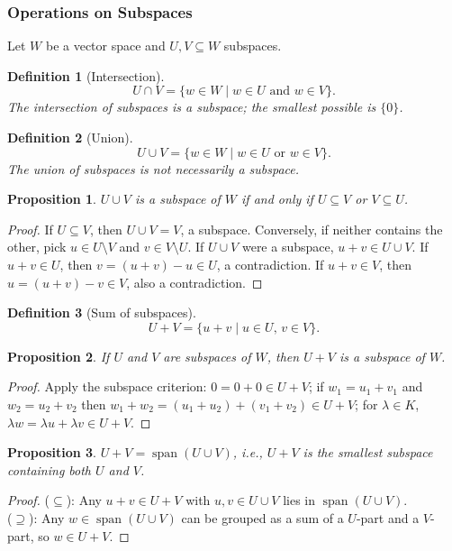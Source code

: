 \documentclass{article}
\newtheorem{definition}{Definition}
\newtheorem{proposition}{Proposition}
\newcommand{\Span}{\operatorname{span}}
\begin{document}
\subsubsection{Operations on Subspaces}
Let $W$ be a vector space and $U,V \subseteq W$ subspaces.
\begin{definition}[Intersection]
    \[U \cap V = \{w \in W \mid w \in U \text{ and } w \in V\}.\]
    The intersection of subspaces is a subspace; the smallest possible is $\{0\}$.
\end{definition}
\begin{definition}[Union]
    \[U \cup V = \{w \in W \mid w \in U \text{ or } w \in V\}.\]
    The union of subspaces is \emph{not} necessarily a subspace.
\end{definition}
\begin{proposition}
    $U \cup V$ is a subspace of $W$ if and only if $U \subseteq V$ or $V \subseteq U$.
\end{proposition}
\begin{proof}
    If $U \subseteq V$, then $U \cup V = V$, a subspace. Conversely, if neither contains the other, pick $u \in U\setminus V$ and $v \in V\setminus U$. If $U \cup V$ were a subspace, $u+v \in U\cup V$. If $u+v \in U$, then $v = (u+v)-u \in U$, a contradiction. If $u+v \in V$, then $u = (u+v)-v \in V$, also a contradiction.
\end{proof}
\begin{definition}[Sum of subspaces]
    \[U + V = \{u+v \mid u \in U,\,v \in V\}.\]
\end{definition}
\begin{proposition}
    If $U$ and $V$ are subspaces of $W$, then $U+V$ is a subspace of $W$.
\end{proposition}
\begin{proof}
    Apply the subspace criterion: $0=0+0\in U+V$; if $w_1=u_1+v_1$ and $w_2=u_2+v_2$ then $w_1+w_2=(u_1+u_2)+(v_1+v_2)\in U+V$; for $\lambda\in K$, $\lambda w=\lambda u+\lambda v\in U+V$.
\end{proof}
\begin{proposition}
    $U+V = \Span(U\cup V)$, i.e., $U+V$ is the smallest subspace containing both $U$ and $V$.
\end{proposition}
\begin{proof}
    ($\subseteq$): Any $u+v \in U+V$ with $u,v\in U\cup V$ lies in $\Span(U\cup V)$.\\
    ($\supseteq$): Any $w\in\Span(U\cup V)$ can be grouped as a sum of a $U$-part and a $V$-part, so $w\in U+V$.
\end{proof}
\end{document}
